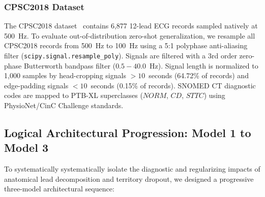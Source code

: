 \documentclass[5p,twocolumn,10pt]{elsarticle}
\begin{document}
\subsubsection{CPSC2018 Dataset}
The CPSC2018 dataset~\cite{liu2018open} contains 6,877 12-lead ECG records sampled natively at 500~Hz. To evaluate out-of-distribution zero-shot generalization, we resample all CPSC2018 records from 500~Hz to 100~Hz using a 5:1 polyphase anti-aliasing filter (\texttt{scipy.signal.resample\_poly}). Signals are filtered with a 3rd order zero-phase Butterworth bandpass filter ($0.5 - 40.0$~Hz). Signal length is normalized to 1,000 samples by head-cropping signals $> 10$~seconds (64.72\% of records) and edge-padding signals $< 10$~seconds (0.15\% of records). SNOMED CT diagnostic codes are mapped to PTB-XL superclasses ($NORM$, $CD$, $STTC$) using PhysioNet/CinC Challenge standards.

\subsection{Logical Architectural Progression: Model 1 to Model 3}
To systematically systematically isolate the diagnostic and regularizing impacts of anatomical lead decomposition and territory dropout, we designed a progressive three-model architectural sequence:
\end{document}
